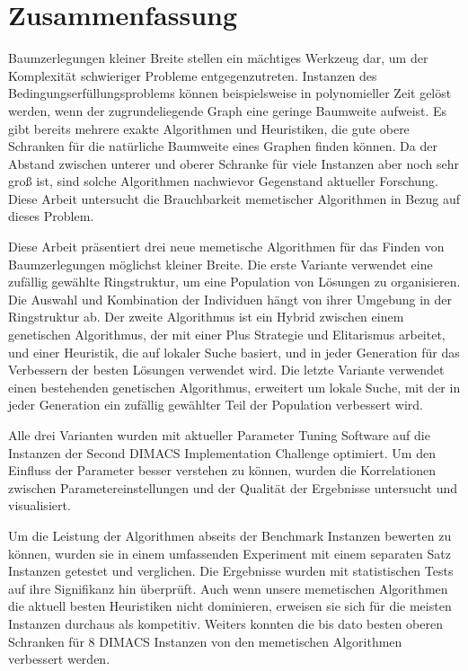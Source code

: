 \documentclass[thesis.tex]{subfiles}
\begin{document}
\chapter*{Zusammenfassung}

Baumzerlegungen kleiner Breite stellen ein mächtiges Werkzeug dar, um der Komplexität schwieriger Probleme entgegenzutreten. Instanzen des Bedingungserfüllungsproblems können beispielsweise in polynomieller Zeit gelöst werden, wenn der zugrundeliegende Graph eine geringe Baumweite aufweist. Es gibt bereits mehrere exakte Algorithmen und Heuristiken, die gute obere Schranken für die natürliche Baumweite eines Graphen finden können. Da der Abstand zwischen unterer und oberer Schranke für viele Instanzen aber noch sehr groß ist, sind solche Algorithmen nachwievor Gegenstand aktueller Forschung. Diese Arbeit untersucht die Brauchbarkeit memetischer Algorithmen in Bezug auf dieses Problem.

Diese Arbeit präsentiert drei neue memetische Algorithmen für das Finden von Baumzerlegungen möglichst kleiner Breite. Die erste Variante verwendet eine zufällig gewählte Ringstruktur, um eine Population von Lösungen zu organisieren. Die Auswahl und Kombination der Individuen hängt von ihrer Umgebung in der Ringstruktur ab. Der zweite Algorithmus ist ein Hybrid zwischen einem genetischen Algorithmus, der mit einer Plus Strategie und Elitarismus arbeitet, und einer Heuristik, die auf lokaler Suche basiert, und in jeder Generation für das Verbessern der besten Lösungen verwendet wird. Die letzte Variante verwendet einen bestehenden genetischen Algorithmus, erweitert um lokale Suche, mit der in jeder Generation ein zufällig gewählter Teil der Population verbessert wird.

Alle drei Varianten wurden mit aktueller Parameter Tuning Software auf die Instanzen der Second \gls{DIMACS} Implementation Challenge optimiert. Um den Einfluss der Parameter besser verstehen zu können, wurden die Korrelationen zwischen Parametereinstellungen und der Qualität der Ergebnisse untersucht und visualisiert.

Um die Leistung der Algorithmen abseits der Benchmark Instanzen bewerten zu können, wurden sie in einem umfassenden Experiment mit einem separaten Satz Instanzen getestet und verglichen. Die Ergebnisse wurden mit statistischen Tests auf ihre Signifikanz hin überprüft. Auch wenn unsere memetischen Algorithmen die aktuell besten Heuristiken nicht dominieren, erweisen sie sich für die meisten Instanzen durchaus als kompetitiv. Weiters konnten die bis dato besten oberen Schranken für 8 \gls{DIMACS} Instanzen von den memetischen Algorithmen verbessert werden.
\end{document}
